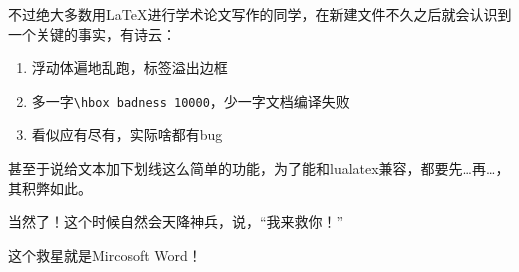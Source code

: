 \documentclass{dreamClass}
\begin{document}




\begin{remark}
    不过绝大多数用\LaTeX{}进行学术论文写作的同学，在新建文件不久之后就会认识到一个关键的事实，有诗云：
    \begin{enumerate}
        \item 浮动体遍地乱跑，标签溢出边框
        \item 多一字\verb+\hbox badness 10000+，少一字文档编译失败
        \item 看似应有尽有，实际啥都有bug
    \end{enumerate}
    甚至于说给文本加下划线这么简单的功能，为了能和lualatex兼容，都要先…再…，其积弊如此。

    当然了！这个时候自然会天降神兵，说，“我来救你！”

    这个救星就是Mircosoft\textsuperscript{\small\textregistered} Word！
\end{remark}
\end{document}
